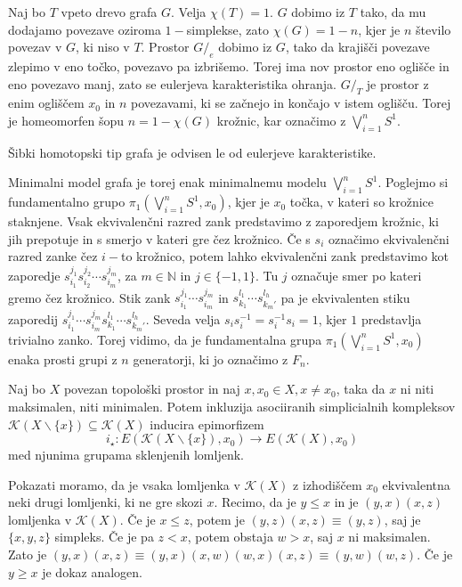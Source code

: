 \documentclass[mat1]{fmfdelo}
\newcommand{\N}{\mathbb N}
\begin{document}
Naj bo $T$ vpeto drevo grafa $G$. Velja $\chi(T)=1$. $G$ dobimo iz $T$ tako, da mu dodajamo povezave 
oziroma $1-$simplekse, zato $\chi(G)=1-n$, kjer je $n$ število povezav v $G$, ki niso v 
$T$. Prostor $G/_e$ dobimo iz $G$, tako da krajišči povezave zlepimo v eno točko, povezavo pa 
izbrišemo. Torej ima nov prostor eno oglišče in eno povezavo manj, zato se eulerjeva karakteristika 
ohranja. $G/_T$ je prostor z enim ogliščem $x_0$ in $n$ povezavami, ki se začnejo in končajo v istem 
oglišču. Torej je homeomorfen šopu $n=1-\chi(G)$ krožnic, kar označimo z $\bigvee\limits_{i=1}^{n}S^1$.

\begin{posledica}
    Šibki homotopski tip grafa je odvisen le od eulerjeve karakteristike.
    \label{pos:karakteristika}
\end{posledica}

Minimalni model grafa je torej enak minimalnemu modelu  $\bigvee\limits_{i=1}^{n}S^1$. Poglejmo si 
fundamentalno grupo  $\pi_1(\bigvee\limits_{i=1}^{n}S^1,x_0)$, kjer je $x_0$ točka, v kateri so krožnice 
staknjene. Vsak ekvivalenčni razred zank predstavimo z zaporedjem krožnic, ki jih prepotuje in s 
smerjo v kateri gre čez krožnico. Če s $s_i$ označimo ekvivalenčni razred zanke čez $i-$to krožnico, potem lahko ekvivalenčni 
zank  predstavimo kot zaporedje $s_{i_1}^{j_1}s_{i_2}^{j_2}\cdots s_{i_m}^{j_m}$, za $m\in \N$ in 
$j\in \{-1,1\}.$ Tu $j$ označuje smer po kateri gremo čez krožnico. Stik zank 
$s_{i_1}^{j_1}\cdots s_{i_m}^{j_m}$ in $s_{k_1}^{l_1}\cdots s_{k_m'}^{l_h}$ pa je ekvivalenten 
stiku zaporedij $s_{i_1}^{j_1}\cdots s_{i_m}^{j_m}s_{k_1}^{l_1}\cdots s_{k_m'}^{l_h}$.
Seveda velja $s_i s_i^{-1}=s_i^{-1}s_i=1$, kjer $1$ predstavlja trivialno zanko. 
Torej vidimo, da je fundamentalna grupa $\pi_1(\bigvee\limits_{i=1}^{n}S^1,x_0)$ enaka prosti grupi z $n$
generatorji, ki jo označimo z $F_n$.

\begin{trditev}
    Naj bo $X$ povezan topološki prostor in naj $x,x_0\in X, x\neq x_0$, taka da $x$ ni niti maksimalen, niti minimalen. Potem inkluzija asociiranih simplicialnih kompleksov $\mathcal{K}(X\backslash\{x\})\subseteq \mathcal{K}(X)$ inducira epimorfizem 
    $$
i_\star:E(\mathcal{K}(X\backslash\{x\}),x_0)\rightarrow E(\mathcal{K}(X),x_0)
    $$
    med njunima grupama sklenjenih lomljenk.
\end{trditev}

\begin{dokaz}
    Pokazati moramo, da je vsaka lomljenka v $\mathcal{K}(X)$ z izhodiščem $x_0$ ekvivalentna neki drugi lomljenki, ki ne gre skozi $x$.
    Recimo, da je $y\leq x$ in je $(y,x)(x,z)$ lomljenka v $\mathcal{K}(X)$. Če je $x\leq z$, potem je $(y,z)(x,z)\equiv(y,z)$, saj je $\{x,y,z\}$ simpleks. Če je pa $z< x$, potem obstaja $w>x$, saj $x$ ni maksimalen. Zato je $(y,x)(x,z)\equiv(y,x)(x,w)(w,x)(x,z)\equiv (y,w)(w,z)$. Če je $y\geq x$ je dokaz analogen.
\end{dokaz}
\end{document}

